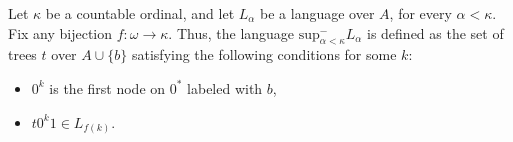 %

\vspace{0.2cm}
 \hspace{0.1cm}

\noindent  Let $\kappa$ be a countable ordinal, and let  $L_\alpha$ be a language over $A$,
for every $\alpha < \kappa$. Fix any bijection $f: \omega \to \kappa$. Thus, the language $\mathrm{sup}^-_{\alpha<\kappa} L_\alpha$ is defined as the set of trees $t$ over $A\cup\{b\}$ satisfying the following conditions for some $k$:
\begin{itemize}
\item $0^k$ is the first node on $0^*$ labeled with $b$,
\item $t0^k1 \in L_{f(k)}$.
\end{itemize}

